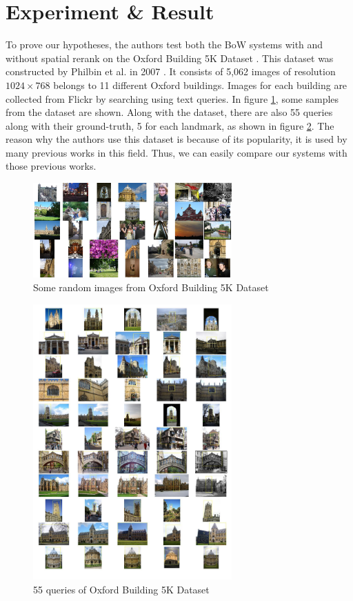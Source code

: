 \section{Experiment \& Result} \label{section:experiment_result}

To prove our hypotheses, the authors test both the BoW systems with and without spatial rerank on the Oxford Building 5K Dataset \cite{oxbuilding}. This dataset was constructed by Philbin et al. in 2007 \cite{2}. It consists of 5,062 images of resolution $1024 \times 768$ belongs to 11 different Oxford buildings. Images for each building are collected from Flickr by searching using text queries. In figure \ref{fig:oxbuilding}, some samples from the dataset are shown. Along with the dataset, there are also 55 queries along with their ground-truth, 5 for each landmark, as shown in figure \ref{fig:oxbuilding_query}. The reason why the authors use this dataset is because of its popularity, it is used by many previous works in this field. Thus, we can easily compare our systems with those previous works.

\begin{figure}
    \centering
    \includegraphics[width=3.0in]{oxbuilding.jpg}
    \caption{Some random images from Oxford Building 5K Dataset}
    \label{fig:oxbuilding}
\end{figure}

\begin{figure}
    \centering
    \includegraphics[width=3.0in]{oxbuilding_query.pdf}
    \caption{55 queries of Oxford Building 5K Dataset}
    \label{fig:oxbuilding_query}
\end{figure}

